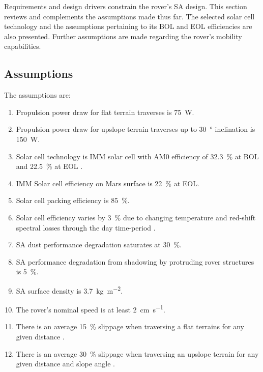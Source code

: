 Requirements and design drivers constrain the rover's \ac{SA} design. This section reviews and complements the assumptions made thus far. The selected solar cell technology and the assumptions pertaining to its \ac{BOL} and \ac{EOL} efficiencies are also presented. Further assumptions are made regarding the rover's mobility capabilities.

\subsection{Assumptions}
\label{sec:RequirementsAndDesignDrivers:Assumptions}
The assumptions are:

\resetLeadingZeroCounter
\begin{enumerate}[leftmargin=1.31cm, label=\zeroLeadCounter{A}]
    \item Propulsion power draw for flat terrain traverses is \SI{75}{\watt}.
    \item Propulsion power draw for upslope terrain traverses up to \SI{30}{\degree} inclination is \SI{150}{\watt}.
    \item Solar cell technology is \ac{IMM} solar cell with AM0 efficiency of \SI{32.3}{\percent} at \ac{BOL} and \SI{22.5}{\percent} at \ac{EOL} .
    \item \label{itm:ass:solar_cell_efficiency} \ac{IMM} Solar cell efficiency on Mars surface is \SI{22}{\percent} at \ac{EOL}.
    \item \label{itm:ass:packing_efficiency} Solar cell packing efficiency is \SI{85}{\percent}.
    \item \label{itm:ass:red_shifts} Solar cell efficiency varies by \SI{3}{\percent} due to changing temperature and red-shift spectral losses through the day time-period .
    \item \label{itm:ass:dust_deposition_saturation} \ac{SA} dust performance degradation saturates at \SI{30}{\percent}.
    \item \label{itm:ass:protruding_shadowing} \ac{SA} performance degradation from shadowing by protruding rover structures is \SI{5}{\percent}.
    \item \label{itm:ass:sa_surface_density} \ac{SA} surface density is \SI{3.7}{kg.m^{-2}}.
    \item The rover's nominal speed is at least \SI{2}{cm.s^{-1}}.
    \item There is an average \SI{15}{\percent} slippage when traversing a flat terrains for any given distance .
    \item There is an average \SI{30}{\percent} slippage when traversing an upslope terrain for any given distance and slope angle .
\end{enumerate}

